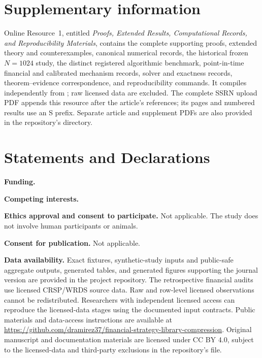 \documentclass[pdflatex,sn-mathphys-ay]{sn-jnl}
\numberwithin{equation}{section}
\theoremstyle{definition}
\theoremstyle{plain}
\newcommand{\DeclarationHead}[1]{%
  \par\medskip\noindent\textbf{#1.}\enspace}
\begin{document}

\maketitle







\FloatBarrier

\FloatBarrier

\FloatBarrier


\backmatter

\section*{Supplementary information}
Online Resource~1, entitled \emph{Proofs, Extended Results, Computational
Records, and Reproducibility Materials}, contains the complete supporting
proofs, extended theory and counterexamples, canonical numerical records, the
historical frozen \(N=1024\) study, the distinct registered algorithmic
benchmark, point-in-time financial and calibrated mechanism records, solver and exactness records,
theorem--evidence correspondence, and reproducibility commands. It compiles
independently from ; raw licensed
data are excluded.
\ifdefined\SSRNPreprint
The complete SSRN upload PDF appends this resource after the article's
references; its pages and numbered results use an S prefix. Separate article
and supplement PDFs are also provided in the repository's
 directory.
\fi

\section*{Statements and Declarations}

\DeclarationHead{Funding}
\AORFundingStatement

\DeclarationHead{Competing interests}
\AORCompetingInterestsStatement

\DeclarationHead{Ethics approval and consent to participate}
Not applicable. The study does not involve human participants or animals.

\DeclarationHead{Consent for publication}
Not applicable.

\DeclarationHead{Data availability}
Exact fixtures, synthetic-study inputs and public-safe aggregate outputs,
generated tables, and generated figures supporting the journal version are
provided in the project repository. The retrospective financial audits use
licensed CRSP/WRDS source data. Raw and row-level licensed observations cannot
be redistributed. Researchers with independent licensed access can reproduce
the licensed-data stages using the documented input contracts. Public
materials and data-access instructions are available at
\url{https://github.com/dramirez37/financial-strategy-library-compression}.
Original manuscript and documentation materials are licensed under CC BY 4.0,
subject to the licensed-data and third-party exclusions in the repository's
 file.
\end{document}
